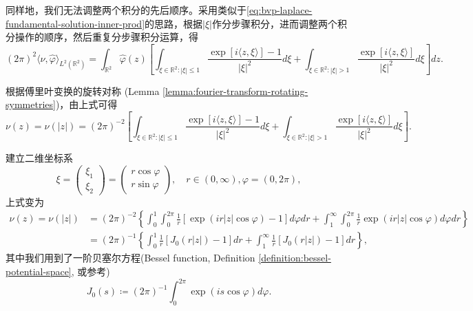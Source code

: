 同样地，我们无法调整两个积分的先后顺序。采用类似于\eqref{eq:bvp-laplace-fundamental-solution-inner-prod}的思路，根据$|\xi|$作分步骤积分，进而调整两个积分操作的顺序，然后重复分步骤积分运算，得
\begin{equation*}
  \left( 2 \pi \right)^2 \langle \nu, \widehat{\varphi} \rangle_{L^2(\mathbb{R}^2)}
  = \int_{\mathbb{R}^2}
  \widehat{\varphi}(z)
  \left[
  \int_{\xi \in \mathbb{R}^2: |\xi| \le 1}
  \frac{
  \exp \left[i \langle z, \xi \rangle \right] - 1
  }{
  |\xi|^2
  }
  d \xi
  + \int_{\xi \in \mathbb{R}^2: |\xi| > 1}
  \frac{
  \exp \left[i \langle z, \xi \rangle \right]
  }{
  |\xi|^2
  }
  d \xi
  \right]
  dz.
\end{equation*}

根据傅里叶变换的旋转对称 (Lemma \ref{lemma:fourier-transform-rotating-symmetries})，由上式可得
\begin{equation*}
  \nu(z) = \nu(|z|) = (2 \pi)^{-2}
  \left[
  \int_{\xi \in \mathbb{R}^2: |\xi| \le 1}
  \frac{
  \exp \left[i \langle z, \xi \rangle \right] - 1
  }{
  |\xi|^2
  }
  d \xi
  + \int_{\xi \in \mathbb{R}^2: |\xi| > 1}
  \frac{
  \exp \left[i \langle z, \xi \rangle \right]
  }{
  |\xi|^2
  }
  d \xi
  \right].
\end{equation*}

建立二维坐标系
\begin{equation*}
  \xi = \begin{pmatrix}
  \xi_1\\ \xi_2
  \end{pmatrix}
  = \begin{pmatrix}
  r \cos \varphi \\
  r \sin \varphi
  \end{pmatrix}, \quad r \in (0,\infty), \varphi = (0, 2 \pi),
\end{equation*}
上式变为
\begin{equation*}
  \begin{split}
    \nu(z) = \nu(|z|) &= (2 \pi)^{-2}
    \left\{
    \int_{0}^{1}
    \int_{0}^{2 \pi}
    \frac{1}{r}
    \left[ \exp \left(i r |z| \cos \varphi \right) - 1 \right]
    d \varphi d r
    +
    \int_{1}^{\infty}
    \int_{0}^{2 \pi}
    \frac{1}{r}
     \exp \left(i r |z| \cos \varphi  \right)
     d \varphi d r
    \right\} \\
    & = \left( 2 \pi \right)^{-1}
    \left\{
    \int_{0}^{1}
    \frac{1}{r}
    \left[
    J_0(r |z|) - 1
    \right]
    dr
    +
    \int_{1}^{\infty}
    \frac{1}{r}
    \left[
    J_0(r |z|) - 1
    \right]
    dr
    \right\},
  \end{split}
\end{equation*}
其中我们用到了一阶贝塞尔方程(Bessel function, Definition \ref{definition:bessel-potential-space}, 或参考\cite[Sec. 8.411]{Gradshteyn:2014uy})
\begin{equation*}
  J_{0}(s) \coloneqq (2 \pi)^{-1} \int_{0}^{2 \pi} \exp \left( i s \cos \varphi \right) d \varphi.
\end{equation*}

